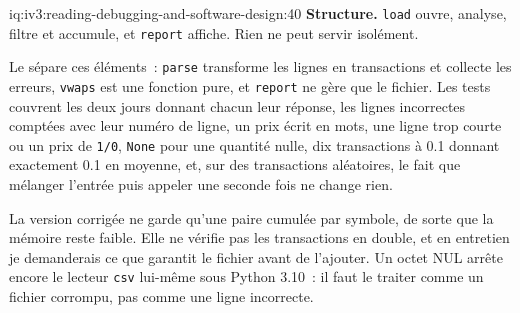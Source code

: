 \begin{solution}{iq:iv3:reading-debugging-and-software-design:40}
\textbf{Structure.} \texttt{load} ouvre, analyse, filtre et accumule, et \texttt{report} affiche. Rien ne peut servir isolément.

Le  sépare ces éléments~: \texttt{parse} transforme les lignes en transactions et collecte les erreurs, \texttt{vwaps} est une fonction pure, et \texttt{report} ne gère que le fichier. Les tests couvrent les deux jours donnant chacun leur réponse, les lignes incorrectes comptées avec leur numéro de ligne, un prix écrit en mots, une ligne trop courte ou un prix de \texttt{1/0}, \texttt{None} pour une quantité nulle, dix transactions à 0.1 donnant exactement 0.1 en moyenne, et, sur des transactions aléatoires, le fait que mélanger l'entrée puis appeler une seconde fois ne change rien.

\enlargethispage{-3\baselineskip}%
\label{lst:iv3:rd:reviewfixed}

La version corrigée ne garde qu'une paire cumulée par symbole, de sorte que la mémoire reste faible. Elle ne vérifie pas les transactions en double, et en entretien je demanderais ce que garantit le fichier avant de l'ajouter. Un octet NUL arrête encore le lecteur \texttt{csv} lui-même sous Python 3.10~: il faut le traiter comme un fichier corrompu, pas comme une ligne incorrecte.


\end{solution}
